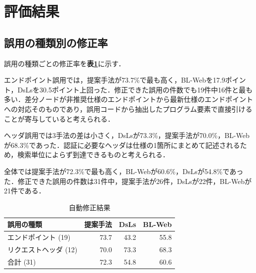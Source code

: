 \section{評価結果}

\subsection{誤用の種類別の修正率}
誤用の種類ごとの修正率を\textbf{表\ref{tab:main}}に示す．

エンドポイント誤用では，提案手法が73.7\%で最も高く，BL-Webを17.9ポイント，DsLsを30.5ポイント上回った．修正できた誤用の件数でも19件中16件と最も多い．差分ノードが非推奨仕様のエンドポイントから最新仕様のエンドポイントへの対応そのものであり，誤用コードから抽出したプログラム要素で直接引けることが寄与していると考えられる．

ヘッダ誤用では3手法の差は小さく，DsLsが73.3\%，提案手法が70.0\%，BL-Webが68.3\%であった．認証に必要なヘッダは仕様の1箇所にまとめて記述されるため，検索単位によらず到達できるものと考えられる．

全体では提案手法が72.3\%で最も高く，BL-Webが60.6\%，DsLsが54.8\%であった．修正できた誤用の件数は31件中，提案手法が26件，DsLsが22件，BL-Webが21件である．
\begin{table}[t]
\centering
\caption{自動修正結果}
\label{tab:main}
\small
\begin{tabular}{l|rrr}
\hline\hline
誤用の種類 & 提案手法 & DsLs & BL-Web \\
\hline
エンドポイント (19) & 73.7 & 43.2 & 55.8 \\
リクエストヘッダ (12) & 70.0 & 73.3 & 68.3 \\
\hline
合計 (31) & 72.3 & 54.8 & 60.6 \\
\hline
\end{tabular}
\end{table}
%
